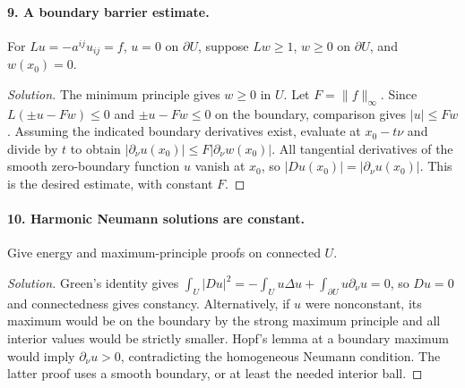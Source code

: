 \paragraph{9. A boundary barrier estimate.}
For $Lu=-a^{ij}u_{ij}=f$, $u=0$ on $\partial U$, suppose
$Lw\geq1$, $w\geq0$ on $\partial U$, and $w(x_0)=0$.
\begin{proof}[Solution]
The minimum principle gives $w\geq0$ in $U$.
Let $F=\|f\|_\infty$. Since
$L(\pm u-Fw)\leq0$ and $\pm u-Fw\leq0$ on the boundary,
comparison gives $|u|\leq Fw$.
Assuming the indicated boundary derivatives exist, evaluate at
$x_0-t\nu$ and divide by $t$ to obtain
$|\partial_\nu u(x_0)|\leq F|\partial_\nu w(x_0)|$.
All tangential derivatives of the smooth zero-boundary function $u$
vanish at $x_0$, so $|Du(x_0)|=|\partial_\nu u(x_0)|$.
This is the desired estimate, with constant $F$.
\end{proof}
\Needspace{45mm}

\Needspace{30mm}

\Needspace{80mm}
\paragraph{10. Harmonic Neumann solutions are constant.}
Give energy and maximum-principle proofs on connected $U$.
\begin{proof}[Solution]
Green's identity gives
$\int_U|Du|^2=-\int_Uu\Delta u+\int_{\partial U}u\partial_\nu u=0$,
so $Du=0$ and connectedness gives constancy.
Alternatively, if $u$ were nonconstant, its maximum would be on the
boundary by the strong maximum principle and all interior values would
be strictly smaller. Hopf's lemma at a boundary maximum would imply
$\partial_\nu u>0$, contradicting the homogeneous Neumann condition.
The latter proof uses a smooth boundary, or at least the needed interior ball.
\end{proof}

\Needspace{30mm}
